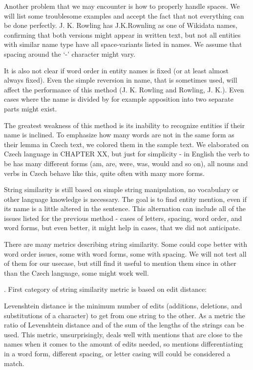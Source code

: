 Another problem that we may encounter is how to properly handle spaces. We will list some troublesome examples and accept the fact that not everything can be done perfectly. J. K. Rowling has J.K.Rownling as one of Wikidata names, confirming that both versions might appear in written text, but not all entities with similar name type have all space-variants listed in names. We assume that spacing around the ‘-’ \todo{-} character might vary.

It is also not clear if word order in entity names is fixed (or at least almost always fixed). Even the simple reversion in name, that is sometimes used, will affect the performance of this method (J. K. Rowling and Rowling, J. K.).  Even cases where the name is divided by for example apposition into two separate parts might exist.

The greatest weakness of this method is its inability to recognize entities if their name is inclined. To emphasize how many words are not in the same form as their lemma in Czech text, we colored them in the sample text.  We elaborated on Czech language in  CHAPTER XX, but just for simplicity - in English the verb to be has many different forms (am, are, were, was, would and so on), all nouns and verbs in Czech behave like this, quite often with many more forms.

 String similarity is still based on simple string manipulation, no vocabulary or other language knowledge is necessary. The goal is to find entity mention, even if its name is a little altered in the sentence. This alternation can include all of the issues listed for the previous method - cases of letters, spacing, word order, and word forms, but even better, it might help in cases, that we did not anticipate.

There are many metrics describing string similarity. Some could cope better with word order issues, some with word forms, some with spacing. We will not test all of them for our usecase, but still find it useful to mention them since in other than the Czech language, some might work well.

. First category of string similarity metric is based on edit distance:

Levenshtein distance is the minimum number of edits (additions, deletions, and substitutions of a character) to get from one string to the other. As a metric the ratio of Levenshtein distance and of the sum of the lengths of the strings can be used. This metric, unsurprisingly, deals well with mentions that are close to the names when it comes to the amount of edits needed, so mentions differentiating in a word form, different spacing, or letter casing will could be considered a match.

